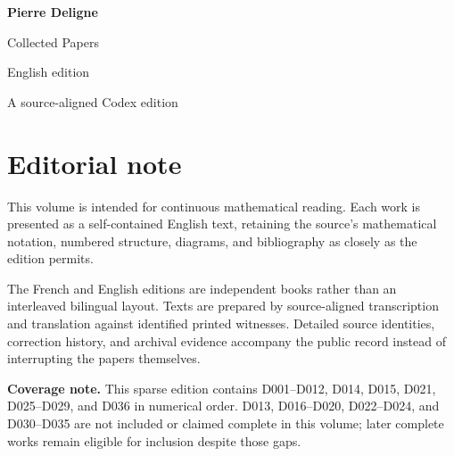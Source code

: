 \documentclass[11pt,a4paper]{article}
\begin{document}
\begin{titlepage}
  \pagecolor{DeligneBlue}
  \color{white}
  \vspace*{34mm}
  {\fontsize{30}{36}\selectfont\bfseries Pierre Deligne\par}
  \vspace{7mm}
  {\fontsize{18}{23}\selectfont Collected Papers\par}
  \vspace{4mm}
  {\large English edition\par}
  \vfill
  {\normalsize A source-aligned Codex edition\par}
\end{titlepage}
\setcounter{page}{2}
\nopagecolor
\color{DeligneInk}
\section*{Editorial note}
This volume is intended for continuous mathematical reading. Each work is presented as a self-contained English text, retaining the source's mathematical notation, numbered structure, diagrams, and bibliography as closely as the edition permits.

The French and English editions are independent books rather than an interleaved bilingual layout. Texts are prepared by source-aligned transcription and translation against identified printed witnesses. Detailed source identities, correction history, and archival evidence accompany the public record instead of interrupting the papers themselves.

\textbf{Coverage note.} This sparse edition contains D001--D012, D014, D015, D021, D025--D029, and D036 in numerical order. D013, D016--D020, D022--D024, and D030--D035 are not included or claimed complete in this volume; later complete works remain eligible for inclusion despite those gaps.
\end{document}
